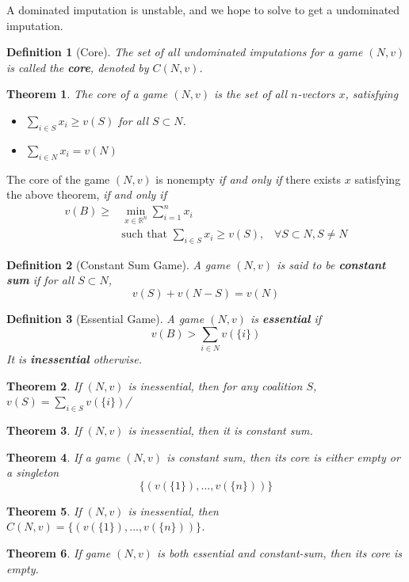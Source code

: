 \documentclass[12pt]{article}
\newtheorem{definition}{Definition}[section]
\newtheorem{theorem}{Theorem}[section]
\theoremstyle{definition}
\begin{document}
A dominated imputation is unstable, and we hope to solve to get a undominated imputation.
\begin{definition}[Core]
\normalfont The set of all undominated imputations for a game $(N, v)$ is called the \textbf{core}, denoted by $C(N, v)$.
\end{definition}
\begin{theorem}
\normalfont The core of a game $(N, v)$ is the set of all $n$-vectors $x$, satisfying
\begin{itemize}
  \item $\sum_{i\in S}x_i\geq v(S)$ for all $S\subset N$.
  \item $\sum_{i\in N}x_i = v(N)$
\end{itemize}
\end{theorem}
The core of the game $(N, v)$ is nonempty \textit{if and only if} there exists $x$ satisfying the above theorem, \textit{if and only if} 
\begin{align*}
v(B)\geq &\min_{x\in \mathbb{R}^n} \sum_{i=1}^n x_i\\
&\text{such that }\sum_{i\in S}x_i\geq v(S), \;\;\;\forall S\subset N, S\neq N
\end{align*}
\begin{definition}[Constant Sum Game]
\normalfont A game $(N, v)$ is said to be \textbf{constant sum} if for all $S\subset N$,
\[
v(S)+v(N-S)=v(N)
\]
\end{definition}
\begin{definition}[Essential Game]
\normalfont A game $(N, v)$ is \textbf{essential} if
\[
v(B)> \sum_{i\in N}v(\{i\})
\]
It is \textbf{inessential} otherwise.
\end{definition}
\begin{theorem}\normalfont If $(N, v)$ is inessential, then for any coalition $S$, $v(S)=\sum_{i\in S}v(\{i\})$/
\end{theorem}
\begin{theorem}\normalfont If $(N, v)$ is inessential, then it is constant sum.
\end{theorem}
\begin{theorem}\normalfont If a game $(N, v)$ is constant sum, then its core is either empty or a singleton
\[
\{(v(\{1\}), \ldots,v(\{n\}) )\}
\]
\end{theorem}
\begin{theorem}\normalfont If $(N, v)$ is inessential, then $C(N, v)=\{(v(\{1\}), \ldots,v(\{n\}) )\}$.
\end{theorem}
\begin{theorem}\normalfont If game $(N, v)$ is both essential and constant-sum, then its core is empty.
\end{theorem}
\end{document}
